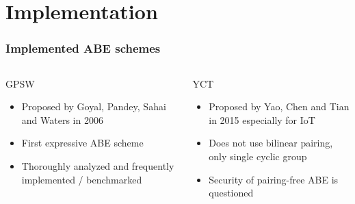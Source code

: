 
%         

\section{Implementation}
\begin{frame}
    \frametitle{Implemented ABE schemes}
    \vspace{2.5cm}
    \begin{columns}[t]\centering
        \begin{block}{\centering GPSW}
            \centering
            \begin{itemize}
                \item Proposed by Goyal, Pandey, Sahai and Waters in 2006
                \item First expressive ABE scheme
                \item Thoroughly analyzed and frequently implemented / benchmarked
            \end{itemize}
        \end{block}

        \begin{block}{\centering YCT}
            \centering
            \begin{itemize}
                \item Proposed by Yao, Chen and Tian in 2015 especially for IoT
                \item Does not use bilinear pairing, only single cyclic group
                \item Security of pairing-free ABE is questioned
            \end{itemize}
        \end{block}
        
    \end{columns}
\end{frame}

